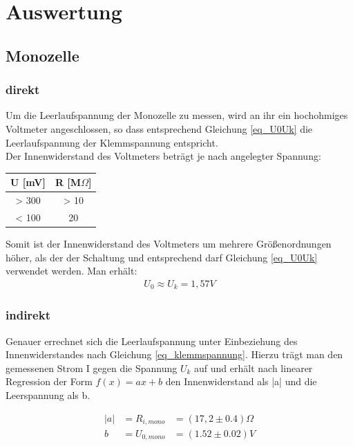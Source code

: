 \section{Auswertung}
\subsection{Monozelle}
\subsubsection{direkt}
Um die Leerlaufspannung der Monozelle zu messen, wird an ihr ein hochohmiges Voltmeter angeschlossen, so dass entsprechend Gleichung \eqref{eq_U0Uk} die Leerlaufspannung der Klemmspannung entspricht.\\
Der Innenwiderstand des Voltmeters beträgt je nach angelegter Spannung:

\begin{table}[H]
\begin{tabular}{c|c}
\hline 
U [mV] & R [M$\Omega$] \\ 
\hline 
> 300 & > 10 \\ 
\hline 
< 100 & 20 \\ 
\hline 
\end{tabular} 
\end{table}

Somit ist der Innenwiderstand des Voltmeters um mehrere Größenordnungen höher, als der der Schaltung und entsprechend darf Gleichung \eqref{eq_U0Uk} verwendet werden. Man erhält: 
\begin{align*}
U_0\approx U_k=1,57V
\end{align*}

\subsubsection{indirekt}
Genauer errechnet sich die Leerlaufspannung unter Einbeziehung des Innenwiderstandes nach Gleichung \eqref{eq_klemmspannung}. Hierzu trägt man den gemessenen Strom I gegen die Spannung $U_k$  auf und erhält nach linearer Regression der Form $f(x)=ax +b$ den Innenwiderstand als |a| und die Leerspannung als b.

\begin{align*}
|a| &= R_{i,mono} &= (17,2\pm 0.4) \Omega\\
b &= U_{0, mono} &= (1.52 \pm 0.02) V
\end{align*}
